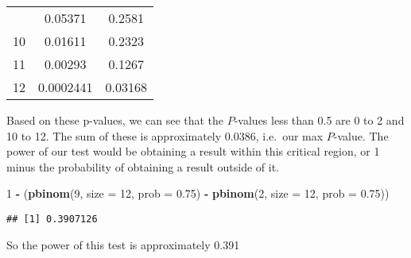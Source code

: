\documentclass[]{article}
\newenvironment{Shaded}{\begin{snugshade}}{\end{snugshade}}
\newcommand{\KeywordTok}[1]{\textcolor[rgb]{0.13,0.29,0.53}{\textbf{#1}}}
\newcommand{\DataTypeTok}[1]{\textcolor[rgb]{0.13,0.29,0.53}{#1}}
\newcommand{\DecValTok}[1]{\textcolor[rgb]{0.00,0.00,0.81}{#1}}
\newcommand{\FloatTok}[1]{\textcolor[rgb]{0.00,0.00,0.81}{#1}}
\newcommand{\StringTok}[1]{\textcolor[rgb]{0.31,0.60,0.02}{#1}}
\newcommand{\OperatorTok}[1]{\textcolor[rgb]{0.81,0.36,0.00}{\textbf{#1}}}
\newcommand{\NormalTok}[1]{#1}
\begin{document}
\begin{longtable}[]{@{}ccc@{}}
\begin{minipage}[t]{0.14\columnwidth}
\end{minipage} & \begin{minipage}[t]{0.13\columnwidth}\centering\strut
0.05371\strut
\end{minipage} & \begin{minipage}[t]{0.13\columnwidth}\centering\strut
0.2581\strut
\end{minipage}\tabularnewline
\begin{minipage}[t]{0.14\columnwidth}\centering\strut
10\strut
\end{minipage} & \begin{minipage}[t]{0.13\columnwidth}\centering\strut
0.01611\strut
\end{minipage} & \begin{minipage}[t]{0.13\columnwidth}\centering\strut
0.2323\strut
\end{minipage}\tabularnewline
\begin{minipage}[t]{0.14\columnwidth}\centering\strut
11\strut
\end{minipage} & \begin{minipage}[t]{0.13\columnwidth}\centering\strut
0.00293\strut
\end{minipage} & \begin{minipage}[t]{0.13\columnwidth}\centering\strut
0.1267\strut
\end{minipage}\tabularnewline
\begin{minipage}[t]{0.14\columnwidth}\centering\strut
12\strut
\end{minipage} & \begin{minipage}[t]{0.13\columnwidth}\centering\strut
0.0002441\strut
\end{minipage} & \begin{minipage}[t]{0.13\columnwidth}\centering\strut
0.03168\strut
\end{minipage}\tabularnewline
\bottomrule
\end{longtable}

Based on these p-values, we can see that the \(P\)-values less than 0.5
are 0 to 2 and 10 to 12. The sum of these is approximately 0.0386,
i.e.~our max \(P\)-value. The power of our test would be obtaining a
result within this critical region, or 1 minus the probability of
obtaining a result outside of it.

\begin{Shaded}
\begin{Highlighting}[]
\DecValTok{1} \OperatorTok{-}\StringTok{ }\NormalTok{(}\KeywordTok{pbinom}\NormalTok{(}\DecValTok{9}\NormalTok{, }\DataTypeTok{size =} \DecValTok{12}\NormalTok{, }\DataTypeTok{prob =} \FloatTok{0.75}\NormalTok{) }\OperatorTok{-}\StringTok{ }
\StringTok{       }\KeywordTok{pbinom}\NormalTok{(}\DecValTok{2}\NormalTok{, }\DataTypeTok{size =} \DecValTok{12}\NormalTok{, }\DataTypeTok{prob =} \FloatTok{0.75}\NormalTok{))}
\end{Highlighting}
\end{Shaded}

\begin{verbatim}
## [1] 0.3907126
\end{verbatim}

So the power of this test is approximately 0.391
\end{document}

